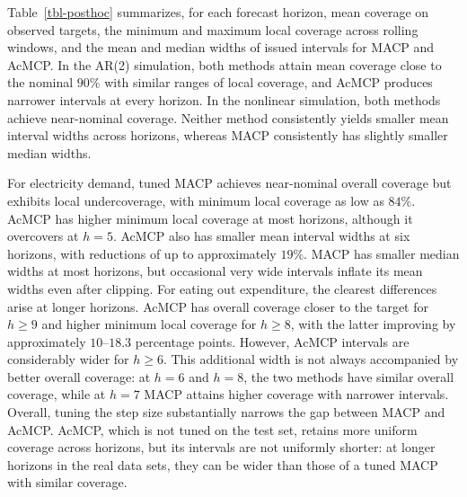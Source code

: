 \documentclass[
  american,
  12pt]{article}
\theoremstyle{plain}
\theoremstyle{plain}
\theoremstyle{remark}
\begin{document}
Table~\ref{tbl-posthoc} summarizes, for each forecast horizon, mean
coverage on observed targets, the minimum and maximum local coverage
across rolling windows, and the mean and median widths of issued
intervals for MACP and AcMCP. In the AR(2) simulation, both methods
attain mean coverage close to the nominal \(90\%\) with similar ranges
of local coverage, and AcMCP produces narrower intervals at every
horizon. In the nonlinear simulation, both methods achieve near-nominal
coverage. Neither method consistently yields smaller mean interval
widths across horizons, whereas MACP consistently has slightly smaller
median widths.

For electricity demand, tuned MACP achieves near-nominal overall
coverage but exhibits local undercoverage, with minimum local coverage
as low as \(84\%\). AcMCP has higher minimum local coverage at most
horizons, although it overcovers at \(h=5\). AcMCP also has smaller mean
interval widths at six horizons, with reductions of up to approximately
\(19\%\). MACP has smaller median widths at most horizons, but
occasional very wide intervals inflate its mean widths even after
clipping. For eating out expenditure, the clearest differences arise at
longer horizons. AcMCP has overall coverage closer to the target for
\(h\geq9\) and higher minimum local coverage for \(h\geq8\), with the
latter improving by approximately \(10\)--\(18.3\) percentage points.
However, AcMCP intervals are considerably wider for \(h\geq6\). This
additional width is not always accompanied by better overall coverage:
at \(h=6\) and \(h=8\), the two methods have similar overall coverage,
while at \(h=7\) MACP attains higher coverage with narrower intervals.
Overall, tuning the step size substantially narrows the gap between MACP
and AcMCP. AcMCP, which is not tuned on the test set, retains more
uniform coverage across horizons, but its intervals are not uniformly
shorter: at longer horizons in the real data sets, they can be wider
than those of a tuned MACP with similar coverage.
\end{document}
